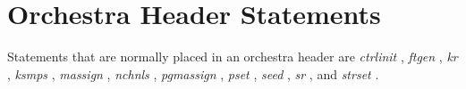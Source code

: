 \begin{comment}
\documentclass[10pt]{article}
\usepackage{fullpage, graphicx, url}
\setlength{\parskip}{1ex}
\setlength{\parindent}{0ex}
\title{Orchestra Header Statements}



\begin{tabular}{ccc}
The Alternative Csound Reference Manual & & \\
Previous &Syntax of the Orchestra &Next

\end{tabular}

\end{comment}
\section{Orchestra Header Statements}


  Statements that are normally placed in an orchestra header are \emph{ctrlinit}
, \emph{ftgen}
, \emph{kr}
, \emph{ksmps}
, \emph{massign}
, \emph{nchnls}
, \emph{pgmassign}
, \emph{pset}
, \emph{seed}
, \emph{sr}
, and \emph{strset}
. 


\begin{comment}
\begin{tabular}{lcr}
Previous &Home &Next \\
Expressions &Up &Instrument Block Statements

\end{tabular}



\end{comment}

